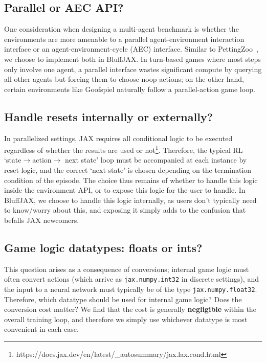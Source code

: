 \subsection{Parallel or AEC API?}
One consideration when designing a multi-agent benchmark is whether the environments are more amenable to a parallel agent-environment interaction interface or an agent-environment-cycle (AEC) interface. Similar to PettingZoo~\citep{terry2021pettingzoo}, we choose to implement both in BluffJAX. In turn-based games where most steps only involve one agent, a parallel interface wastes significant compute by querying all other agents but forcing them to choose noop actions; on the other hand, certain environments like Goofspiel naturally follow a parallel-action game loop.

\subsection{Handle resets internally or externally?}
In parallelized settings, JAX requires all conditional logic to be executed regardless of whether the results are used or not\footnote{https://docs.jax.dev/en/latest/\_autosummary/jax.lax.cond.html}. Therefore, the typical RL `state$\rightarrow$action$\rightarrow$ next state' loop must be accompanied at each instance by reset logic, and the correct `next state' is chosen depending on the termination condition of the episode. The choice thus remains of whether to handle this logic inside the environment API, or to expose this logic for the user to handle. In BluffJAX, we choose to handle this logic internally, as users don't typically need to know/worry about this, and exposing it simply adds to the confusion that befalls JAX newcomers.

\subsection{Game logic datatypes: floats or ints?}
This question arises as a consequence of conversions; internal game logic must often convert actions (which arrive as \texttt{jax.numpy.int32} in discrete settings), and the input to a neural network must typically be of the type \texttt{jax.numpy.float32}. Therefore, which datatype should be used for internal game logic? Does the conversion cost matter? We find that the cost is generally \textbf{negligible} within the overall training loop, and therefore we simply use whichever datatype is most convenient in each case.

